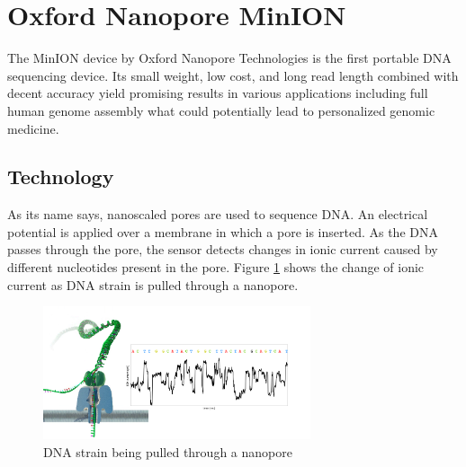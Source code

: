 \documentclass[times, utf8, diplomski, numeric, english]{fer}
\begin{document}
\section{Oxford Nanopore MinION}

The MinION device by Oxford Nanopore Technologies is the first portable DNA sequencing device. Its small weight, low cost, and long read length combined with decent accuracy yield promising results in various applications including full human genome assembly\cite{human_seq} what could potentially lead to personalized genomic medicine.

\subsection{Technology}
As its name says, nanoscaled pores are used to sequence DNA. An electrical potential is applied over a membrane in which a  pore is inserted. 
As the DNA passes through the pore, the sensor detects changes in ionic current caused by different nucleotides present in the pore. Figure \ref{fg:nanopore} shows the change of ionic current as DNA strain is pulled through a nanopore.

\begin{figure}[!ht]
	\begin{center}
		\includegraphics[width=0.7\textwidth]{./imgs/nanopore.png}
		
		\caption[DNA strain being pulled through a nanopore]{DNA strain being pulled through a nanopore \protect\footnotemark}
		\label{fg:nanopore}
	\end{center}
\end{figure}
\end{document}
